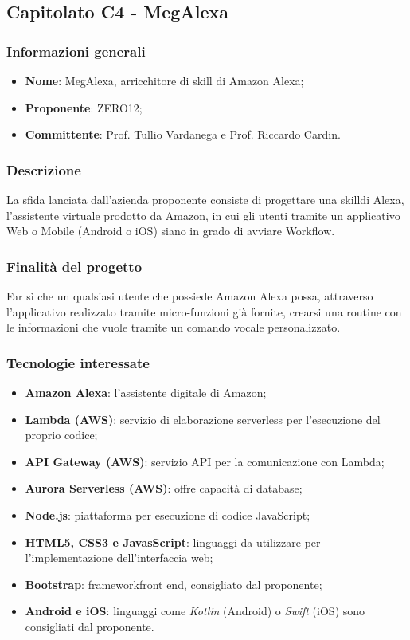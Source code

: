 \subsection{Capitolato C4 - MegAlexa}
\subsubsection{Informazioni generali}
\begin{itemize}
	\item \textbf{Nome}: MegAlexa, arricchitore di skill di Amazon Alexa;
	\item \textbf{Proponente}: ZERO12;
	\item \textbf{Committente}: Prof. Tullio Vardanega e Prof. Riccardo Cardin.
\end{itemize}
\subsubsection{Descrizione}
La sfida lanciata dall’azienda proponente consiste di progettare una skill\glosp di Alexa, l’assistente virtuale prodotto da Amazon, in cui gli utenti tramite un applicativo Web o Mobile (Android o iOS) siano in grado di avviare Workflow\glo.
\subsubsection{Finalità del progetto}
Far sì che un qualsiasi utente che possiede Amazon Alexa possa, attraverso l’applicativo realizzato tramite micro-funzioni già fornite, crearsi una routine con le informazioni che vuole tramite un comando vocale personalizzato.
\subsubsection{Tecnologie interessate}
\begin{itemize}
	\item \textbf{Amazon Alexa}: l'assistente digitale di Amazon;
	\item \textbf{Lambda (AWS)}: servizio di elaborazione serverless per l'esecuzione del proprio codice; 
	\item \textbf{API Gateway (AWS)}: servizio API per la comunicazione con Lambda;
	\item \textbf{Aurora Serverless (AWS)}: offre capacità di database;
	\item \textbf{Node.js\glo}: piattaforma per esecuzione di codice JavaScript;
	\item \textbf{HTML5, CSS3 e JavasScript}: linguaggi da utilizzare per l'implementazione dell'interfaccia web;
	\item \textbf{Bootstrap\glo}: framework\glosp front end, consigliato dal proponente;
	\item \textbf{Android e iOS}: linguaggi come \textit{Kotlin\glosp} (Android) o \textit{Swift\glosp} (iOS) sono consigliati dal proponente.
\end{itemize}
